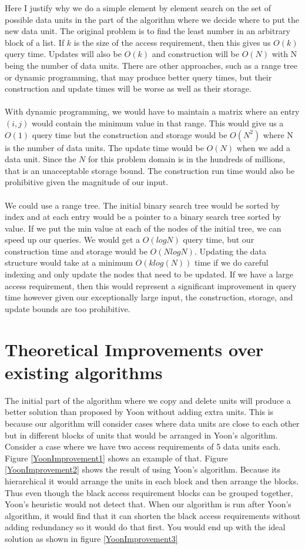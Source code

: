 \documentclass[conference]{acmsiggraph}
\begin{document}
Here I justify why we do a simple element by element search on the set of possible data units in the part of the algorithm where we decide where to put the new data unit. The original problem is to find the least number in an arbitrary block of a list. If $k$ is the size of the access requirement, then this gives us $O(k)$ query time. Updates will also be $O(k)$ and construction will be $O(N)$ with N being the number of data units. There are other approaches, such as a range tree or dynamic programming, that may produce better query times, but their construction and update times will be worse as well as their storage. \\
\\
With dynamic programming, we would have to maintain a matrix where an entry $(i,j)$ would contain the minimum value in that range. This would give us a $O(1)$ query time but the construction and storage would be $O(N^2)$ where N is the number of data units. The update time would be $O(N)$ when we add a data unit. Since the $N$ for this problem domain is in the hundreds of millions, that is an unacceptable storage bound. The construction run time would also be prohibitive given the magnitude of our input. \\
\\
We could use a range tree. The initial binary search tree would be sorted by index and at each entry would be a pointer to a binary search tree sorted by value. If we put the min value at each of the nodes of the initial tree, we can speed up our queries. We would get a $O(log N)$ query time, but our construction time and storage would be $O(N log N)$. Updating the data structure would take at a minimum $O(k log(N))$ time if we do careful indexing and only update the nodes that need to be updated. If we have a large access requirement, then this would represent a significant improvement in query time however given our exceptionally large input, the construction, storage, and update bounds are too prohibitive.  


\section{Theoretical Improvements over existing algorithms}

The initial part of the algorithm where we copy and delete units will produce a better solution than proposed by Yoon without adding extra units. This is because our algorithm will consider cases where data units are close to each other but in different blocks of units that would be arranged in Yoon's algorithm. Consider a case where we have two access requirements of 5 data units each. Figure \ref{YoonImprovement1} shows an example of that. Figure \ref{YoonImprovement2} shows the result of using Yoon's algorithm. Because its hierarchical it would arrange the units in each block and then arrange the blocks. Thus even though the black access requirement blocks can be grouped together, Yoon's heuristic would not detect that. When our algorithm is run after Yoon's algorithm, it would find that it can shorten the black access requirements without adding redundancy so it would do that first. You would end up with the ideal solution as shown in figure \ref{YoonImprovement3}
\end{document}
